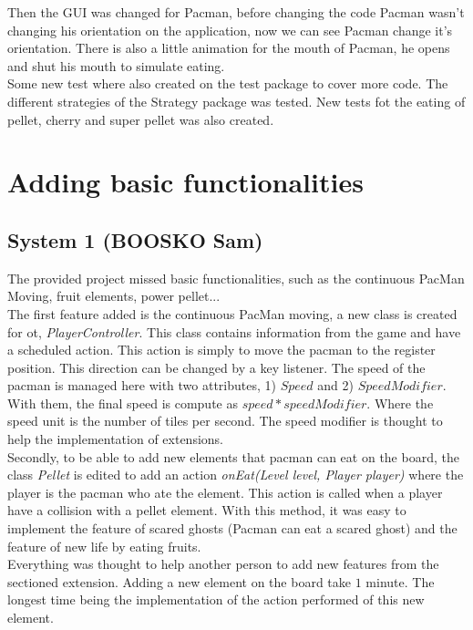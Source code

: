 \documentclass[]{article}
\begin{document}
Then the GUI was changed for Pacman, before changing the code Pacman wasn't changing his orientation on the application, now we can see Pacman change it's orientation. There is also a little animation for the mouth of Pacman, he opens and shut his mouth to simulate eating. 
\\

Some new test where also created on the test package to cover more code. The different strategies of the Strategy package was tested. New tests fot the eating of pellet, cherry and super pellet was also created.
\\




\newpage
\section{Adding basic functionalities}
\subsection{System 1 (BOOSKO Sam)}

The provided project missed basic functionalities, such as the continuous PacMan Moving, fruit elements, power pellet...\\

The first feature added is the continuous PacMan moving, a new class is created for ot, \textit{PlayerController}. This class contains information from the game and have a scheduled action. This action is simply to move the pacman to the register position. This direction can be changed by a key listener. The speed of the pacman is managed here with two attributes, 1) $Speed$ and 2) $SpeedModifier$. With them, the final speed is compute as $speed * speedModifier$. Where the speed unit is the number of tiles per second. The speed modifier is thought to help the implementation of extensions.\\

Secondly, to be able to add new elements that pacman can eat on the board, the class \textit{Pellet} is edited to add an action \textit{onEat(Level level, Player player)} where the player is the pacman who ate the element. This action is called when a player have a collision with a pellet element. With this method, it was easy to implement the feature of scared ghosts (Pacman can eat a scared ghost) and the feature of new life by eating fruits.\\

Everything was thought to help another person to add new features from the sectioned extension. Adding a new element on the board take $1$ minute. The longest time being the implementation of the action performed of this new element.\\
\newpage
\end{document}
